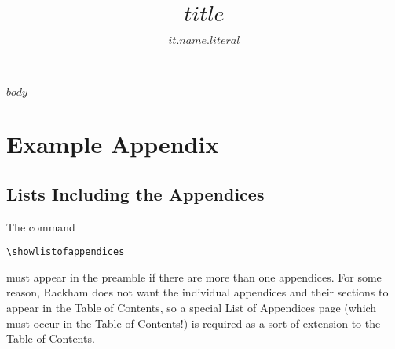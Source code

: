 \documentclass[$if(fontsize)$
$fontsize$,
$endif$
$if(papersize)$
$papersize$paper,
$endif$
$for(classoption)$
$classoption$$sep$,
$endfor$]{rackham}
\title{$title$}
\author{$it.name.literal$}
\begin{document}
$body$


\appendix
\chapter{Example Appendix}

\section{Lists Including the Appendices}
The command
\begin{verbatim}
\showlistofappendices
\end{verbatim}
must appear in the preamble if there are more than one appendices.  For
some reason, Rackham does not want the individual appendices and their
sections to appear in the Table of Contents, so a special List of
Appendices page (which must occur in the Table of Contents!) is required
as a sort of extension to the Table of Contents.


%
%
\end{document}
